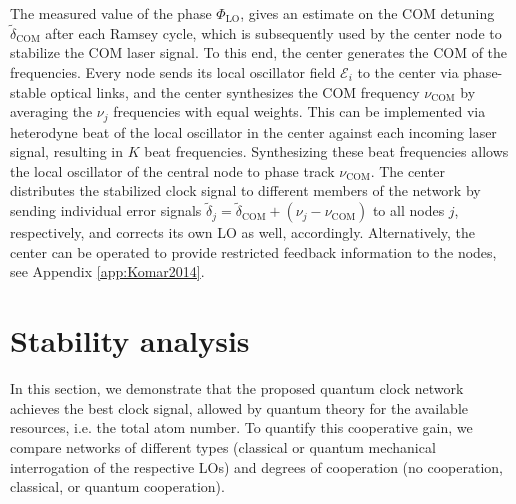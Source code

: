 The measured value of the phase  $\Phi_\mathrm{LO}$,
gives an estimate on the COM detuning
$\tilde\delta_\mathrm{COM}$ after each Ramsey cycle, which is subsequently used
by the center node to stabilize the COM laser signal.
To this end, the center generates the COM of the frequencies. Every node sends
its local oscillator field $\mathcal{E}_i$ to the center via phase-stable
optical links, and the center synthesizes the COM frequency $\nu_\mathrm{COM}$ by
averaging the $\nu_j$ frequencies with equal weights.
This can be implemented via heterodyne beat of the local oscillator in the
center against each incoming laser signal, resulting in $K$ beat frequencies.
Synthesizing  these beat frequencies allows the
local oscillator of the central node to phase track $\nu_\mathrm{COM}$.
The center distributes the stabilized clock signal to different members of the network by sending individual error
signals $\tilde \delta_j = \tilde \delta_\mathrm{COM} + (\nu_j - \nu_\mathrm{COM})$
to all nodes $j$, respectively, and corrects its own LO as well, accordingly.
Alternatively, the center can be operated to provide restricted feedback
information to the nodes, see Appendix \ref{app:Komar2014}.



\section{Stability analysis}
\label{sec:comp}

In this section, we demonstrate that the proposed quantum clock network achieves
the best clock signal, allowed by quantum theory for the available resources, i.e.
the total atom number. 
To quantify this cooperative gain, we compare
networks of different types (classical or quantum mechanical interrogation of
the respective LOs) and degrees of cooperation (no cooperation, classical, or
quantum cooperation).


